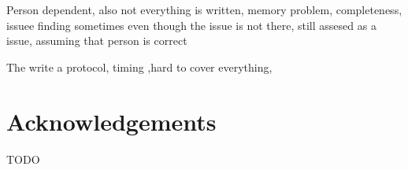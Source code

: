 \documentclass{llncs}
\begin{document}
    Person dependent, also not everything is written, memory problem, completeness, 
    issuee finding sometimes even though the issue is not there, still assesed as a issue, assuming that person is correct

    The write a protocol, timing ,hard to cover everything, 
    

    
    \section*{Acknowledgements}
    TODO

    
    
\end{document}
